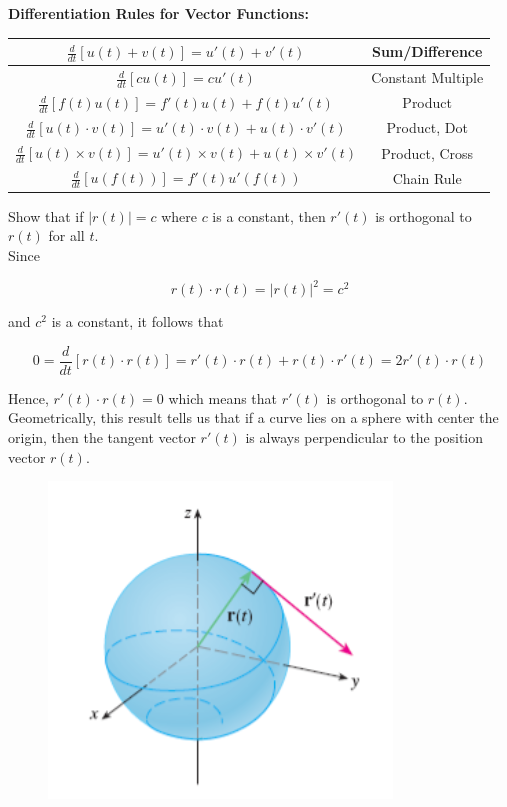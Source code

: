         \textbf{Differentiation Rules for Vector Functions:}
        \begin{center}
            \begin{tabular}{|c|c|}
                \hline
                $\frac{d}{dt}\left[u(t)+v(t)\right]=u'(t) + v'(t)$  & Sum/Difference \\
                \hline
                $\frac{d}{dt}[cu(t)] = cu'(t)$  & Constant Multiple \\
                \hline
                $\frac{d}{dt}[f(t)u(t)]=f'(t)u(t)+f(t)u'(t)$    & Product \\
                \hline
                $\frac{d}{dt}[u(t)\cdot v(t)] = u'(t)\cdot v(t) + u(t) \cdot v'(t)$ & Product, Dot \\
                \hline
                $\frac{d}{dt}[u(t)\times v(t)] = u'(t) \times v(t) + u(t) \times v'(t)$ & Product, Cross \\
                \hline
                $\frac{d}{dt}[u(f(t))] = f'(t) u'(f(t))$    & Chain Rule \\
                \hline
            \end{tabular}
        \end{center}

        \textit{} Show that if $|r(t)| = c$ where $c$ is a constant, then $r'(t)$ is orthogonal to $r(t)$ for all $t$. \\

        Since

        \[
            r(t)\cdot r(t) = |r(t)|^2 = c^2
        \]

        and $c^2$ is a constant, it follows that

        \[
            0 = \frac{d}{dt}[r(t) \cdot r(t)] = r'(t) \cdot r(t) + r(t) \cdot r'(t) = 2r'(t) \cdot r(t)
        \]

        Hence, $r'(t) \cdot r(t) = 0$ which means that $r'(t)$ is orthogonal to $r(t)$. Geometrically, this result tells us that if a curve lies on a sphere with center the origin, then the tangent vector $r'(t)$
        is always perpendicular to the position vector $r(t)$.

        \begin{figure}[hbt!]
            \centering
            \includegraphics[scale = 0.75]{Resources/13.2_Orthogonal}
        \end{figure}

